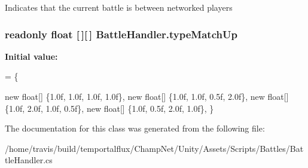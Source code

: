 Indicates that the current battle is between networked players 

\hypertarget{class_battle_handler_aaa33e18e5c8a07eea1a78986ada6a7b5}{
\subsubsection[{type\-Match\-Up}]{\setlength{\rightskip}{0pt plus 5cm}readonly float \mbox{[}$\,$\mbox{]}\mbox{[}$\,$\mbox{]} Battle\-Handler.\-type\-Match\-Up}}\label{class_battle_handler_aaa33e18e5c8a07eea1a78986ada6a7b5}
{\bfseries Initial value\-:}
\begin{DoxyCode}
=
    \{
        
        \textcolor{keyword}{new} \textcolor{keywordtype}{float}[] \{1.0f,  1.0f,   1.0f,   1.0f\}, 
        \textcolor{keyword}{new} \textcolor{keywordtype}{float}[] \{1.0f,  1.0f,   0.5f,   2.0f\}, 
        \textcolor{keyword}{new} \textcolor{keywordtype}{float}[] \{1.0f,  2.0f,   1.0f,   0.5f\}, 
        \textcolor{keyword}{new} \textcolor{keywordtype}{float}[] \{1.0f,  0.5f,   2.0f,   1.0f\}, 
    \}
\end{DoxyCode}


The documentation for this class was generated from the following file\-:\begin{DoxyCompactItemize}
\item 
/home/travis/build/temportalflux/\-Champ\-Net/\-Unity/\-Assets/\-Scripts/\-Battles/Battle\-Handler.\-cs\end{DoxyCompactItemize}
